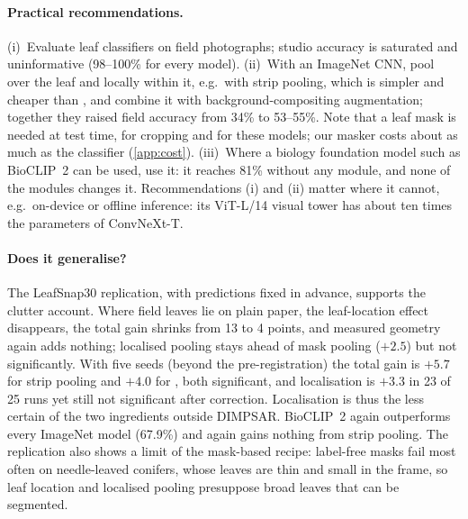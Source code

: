 \paragraph{Practical recommendations.} (i)~Evaluate leaf classifiers on field photographs; studio
accuracy is saturated and uninformative (98--100\% for every model). (ii)~With an ImageNet CNN, pool
over the leaf and locally within it, e.g.\ with strip pooling, which is simpler and cheaper than \SVA{},
and combine it with background-compositing augmentation; together they raised field accuracy from
34\% to 53--55\%. Note that a leaf mask is needed at test time, for cropping and for these models; our
masker costs about as much as the classifier (\cref{app:cost}). (iii)~Where a biology foundation model such as
BioCLIP~2 can be used, use it: it reaches 81\% without any module, and none of the modules changes it.
Recommendations (i) and (ii) matter where it cannot, e.g.\ on-device or offline inference: its
ViT-L/14 visual tower has about ten times the parameters of ConvNeXt-T.

\paragraph{Does it generalise?} The LeafSnap30 replication, with predictions fixed in advance,
supports the clutter account. Where field leaves lie on plain paper, the leaf-location effect
disappears, the total gain shrinks from 13 to 4 points, and measured geometry again adds nothing;
localised pooling stays ahead of mask pooling ($+2.5$) but not significantly. With five seeds (beyond
the pre-registration) the total gain is $+5.7$ for strip pooling and $+4.0$ for \SVA{}, both
significant, and localisation is $+3.3$ in 23 of 25 runs yet still not significant after correction.
Localisation is thus the less certain of the two ingredients outside DIMPSAR. BioCLIP~2 again
outperforms every ImageNet model (67.9\%) and again gains nothing from strip pooling. The replication also shows a limit of
the mask-based recipe: label-free masks fail most often on needle-leaved conifers, whose leaves are
thin and small in the frame, so leaf location and localised pooling presuppose broad leaves that can
be segmented.

